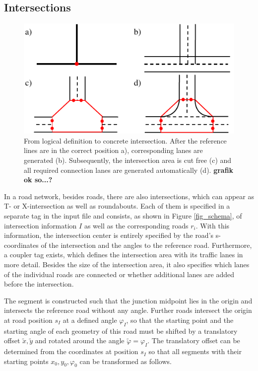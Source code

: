 \documentclass[a4paper, 10pt, conference]{ieeeconf}      %
\begin{document}
\subsection{Intersections}
    \begin{figure}[thpb]        
        \centering
        \includegraphics{fig/createJunction.pdf}
        \caption{From logical definition to concrete intersection. After the reference lines are in the correct position a), corresponding lanes are generated (b). Subsequently, the intersection area is cut free (c) and all required connection lanes are generated automatically (d). \textbf{grafik ok so...?}}
        \label{fig_createJunction}
    \end{figure}

    In a road network, besides roads, there are also intersections, which can appear as T- or X-intersection as well as roundabouts. Each of them is specified in a separate tag in the input file and consists, as shown in Figure \ref{fig_schema}, of intersection information \(I\) as well as the corresponding roads \(r_i\). With this information, the intersection center is entirely specified by the road's s-coordinates of the intersection and the angles to the reference road. Furthermore, a coupler tag exists, which defines the intersection area with its traffic lanes in more detail. Besides the size of the intersection area, it also specifies which lanes of the individual roads are connected or whether additional lanes are added before the intersection.

    The segment is constructed such that the junction midpoint lies in the origin and intersects the reference road without any angle. Further roads intersect the origin at road position \(s_I\) at a defined angle \(\varphi_I\), so that the starting point and the starting angle of each geometry of this road must be shifted by a translatory offset \(\tilde{x}, \tilde{y}\) and rotated around the angle \(\tilde{\varphi} = \varphi_I\). The translatory offset can be determined from the coordinates at position \(s_I\) so that all segments with their starting points \(x_0,y_0,\varphi_0\) can be transformed as follows.
\end{document}
